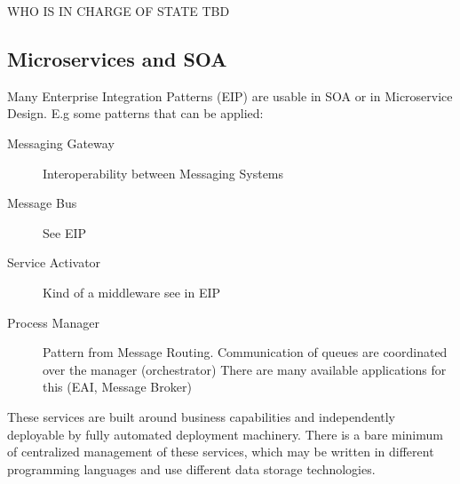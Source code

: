 \documentclass[../Main.tex]{subfiles}
\begin{document}
WHO IS IN CHARGE OF STATE TBD


\subsection{Microservices and SOA}

Many Enterprise Integration Patterns (EIP) are usable in SOA or in Microservice Design.
E.g some patterns that can be applied:
\begin{description}
    \item[Messaging Gateway] Interoperability between Messaging Systems
    \item[Message Bus] See EIP
    \item[Service Activator] Kind of a middleware see in EIP
    \item[Process Manager] Pattern from Message Routing. Communication of queues are coordinated over the manager (orchestrator)
    There are many available applications for this (EAI, Message Broker)
\end{description}

These services are built around business 
capabilities and independently deployable by fully automated deployment machinery.
There is a bare minimum of centralized management of these services, which may be written in
different programming languages and use different data storage technologies.

\end{document}
